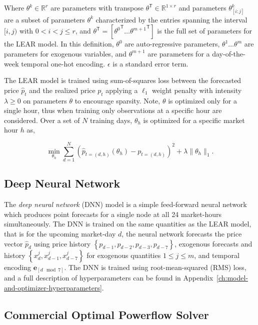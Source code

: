 Where $\theta^k \in \mathbb{R}^r$ are parameters with transpose $\theta^\mathsf{T} \in \mathbb{R}^{1 \times r}$ and
parameters ${\theta^k_{\left[i:j\right]}}$ are a subset of parameters $\theta^k$
characterized by the entries spanning the interval $[i, j)$ with $0 < i < j \leq r$, and
$\theta^\mathsf{T} = [{\theta^0}^\mathsf{T} \dots {\theta^{m+1}}^\mathsf{T}]$ is the full set of parameters for the LEAR model.
In this definition, $\theta^0$ are auto-regressive parameters, $\theta^{1} \dots \theta^{m}$ are parameters
for exogenous variables, and $\theta^{m+1}$ are parameters for a day-of-the-week temporal one-hot encoding. $\epsilon$
is a standard error term.

The LEAR model is trained using sum-of-squares loss between the forecasted price $\hat{p}_t$ and the realized price
$p_t$ applying a $\ell_1$ weight penalty with intensity $\lambda \geq 0$ on parameters $\theta$ to encourage sparsity.
Note, $\theta$ is optimized only for a single hour, thus when training only observations at a specific hour are considered.
Over a set of $N$ training days, $\theta_h$ is optimized for a specific market hour $h$ as,

\begin{equation}
    \min_{\theta_h} \sum_{d=1}^N \left(\hat{p}_{t=(d, h)}(\theta_h) - p_{t=(d, h)}\right)^2 + \lambda \lVert \theta_h \rVert_1. \nonumber
    \label{eq:lear_loss}
\end{equation}

\subsection{Deep Neural Network}\label{subsec:deep-neural-network}

The \textit{deep neural network} (DNN) model is a simple feed-forward neural network which produces point forecasts for
a single node at all 24 market-hours simultaneously.
The DNN is trained on the same quantities as the LEAR model, that is for the upcoming market-day $d$, the neural network
forecasts the price vector $\hat{p}_d$ using price history $\left\{ p_{d-1}, p_{d-2}, p_{d-3}, p_{d-7} \right\}$,
exogenous forecasts and history $\left\{ x^j_{d}, x^j_{d - 1}, x^j_{d-7} \right\}$ for exogenous quantities
$1 \leq j \leq m$, and temporal encoding $\mathbf{e}_{\left[d \mod 7\right]}$.
The DNN is trained using root-mean-squared (RMS) loss, and a full description of hyperparameters can be found in
Appendix~\ref{ch:model-and-optimizer-hyperparameters}.

\subsection{Commercial Optimal Powerflow Solver}\label{subsec:commercial-optimal-powerflow-solver}


